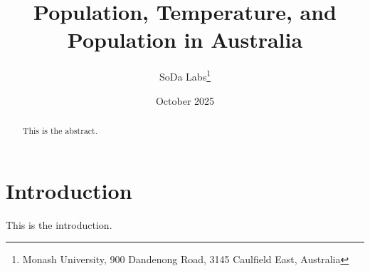 \documentclass[12pt,a4paper]{article}
\title{Population, Temperature, and Population in Australia}
\author{SoDa Labs\thanks{Monash University, 900 Dandenong Road, 3145 Caulfield East, Australia}}
\date{October 2025}
\begin{document}
\maketitle

\begin{abstract}
This is the abstract.
\end{abstract}

\section{Introduction}
This is the introduction.
\end{document}
